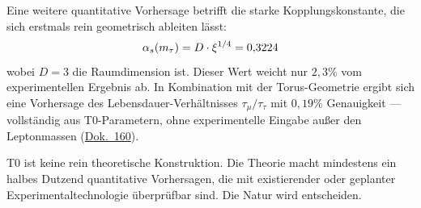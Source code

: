 Eine weitere quantitative Vorhersage betrifft die starke Kopplungskonstante, die sich erstmals rein geometrisch ableiten lässt:
\begin{equation}
\alpha_s(m_\tau) = D \cdot \xi^{1/4} = 0{,}3224
\end{equation}
wobei $D = 3$ die Raumdimension ist. Dieser Wert weicht nur $2{,}3\%$ vom experimentellen Ergebnis ab. In Kombination mit der Torus-Geometrie ergibt sich eine Vorhersage des Lebensdauer-Verhältnisses $\tau_\mu/\tau_\tau$ mit $0{,}19\%$ Genauigkeit --- vollständig aus T0-Parametern, ohne experimentelle Eingabe außer den Leptonmassen (\href{https://github.com/jpascher/T0-Time-Mass-Duality/blob/main/2/pdf/160_T0_Lepton-Lebensdauer-Verh_De.pdf}{Dok.~160}).

\begin{zusammenfassung}
T0 ist keine rein theoretische Konstruktion. Die Theorie macht mindestens ein halbes Dutzend quantitative Vorhersagen, die mit existierender oder geplanter Experimentaltechnologie überprüfbar sind. Die Natur wird entscheiden.
\end{zusammenfassung}
